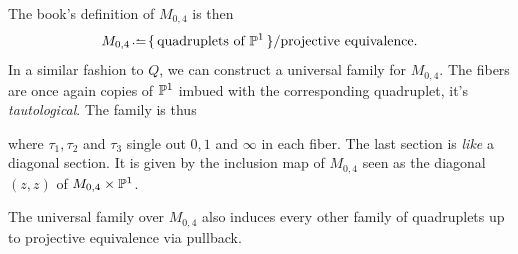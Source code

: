 \documentclass[12pt]{memoir}
\begin{document}
The book's definition of $M_{0,4}$ is then 
$$M_{0,4}\defeq\set{\text{quadruplets of }\bP^1}/\text{projective equivalence}.$$
In a similar fashion to $Q$, we can construct a universal family for $M_{0,4}$. The fibers are once again copies of $\mathbb{P}^1$ imbued with the corresponding quadruplet, it's \emph{tautological}. The family is thus 
\begin{center}
    \end{center}
where $\tau_1,\tau_2$ and $\tau_3$ single out $0,1$ and $\infty$ in each fiber. The last section is \emph{like} a diagonal section. It is given by the inclusion map of $M_{0,4}$ seen as the diagonal $(z,z)$ of $M_{0,4}\times\mathbb{P}^1$.

\begin{Th}
The universal family over $M_{0,4}$ also induces every other family of quadruplets up to projective equivalence via pullback. 
\end{Th}
\end{document}
